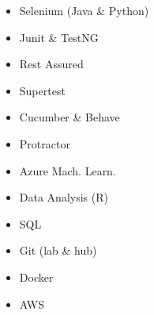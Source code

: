 \documentclass[9pt]{developercv} %
\begin{document}
\vspace{0.5cm}


	
\begin{minipage}[t]{0.5\textwidth} %
	\vspace{-\baselineskip} %
	\begin{barchart}{5.5}
	\end{barchart}
\end{minipage}
\hfill %
\begin{minipage}[t]{0.53\textwidth} %
	\vspace{-\baselineskip} %
		
		\begin{minipage}[t]{0.5\textwidth}
			\begin{itemize}[label={\large\textbullet}]
				\setlength\itemsep{0.01em}
				\item Selenium (Java \& Python)
				\item Junit \& TestNG 
				\item Rest Assured
				\item Supertest
				\item Cucumber \& Behave
				\item Protractor
			\end{itemize}
		\end{minipage}
		\begin{minipage}[t]{0.5\textwidth}
			\begin{itemize}
				\setlength\itemsep{0.01em}
				\item Azure Mach. Learn.
				\item Data Analysis (R)
				\item SQL
				\item Git (lab \& hub)
				\item Docker
				\item AWS
			\end{itemize}
	\end{minipage}
\end{minipage}
%
\end{document}

